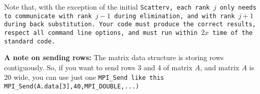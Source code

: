 \documentclass{article}
\begin{document}
\begin{enumerate}
Note that, with the exception of the initial \tt{Scatterv}, each rank $j$
only needs to communicate with rank $j-1$ during elimination, and with
rank $j+1$ during back substitution.  Your code must produce the
correct results, respect all command line options, and must run within
$2x$ time of the standard code. 

\noindent\textbf{A note on sending rows:} The matrix data structure
is storing rows contiguously.  So, if you want to send rows 3 and 4 of
matrix $A$, and matrix $A$ is 20 wide, you can use just one
\tt{MPI\_Send} like this\\
\tt{MPI\_Send(A.data[3],40,MPI\_DOUBLE,...)}
 
\end{enumerate}


\end{document}
